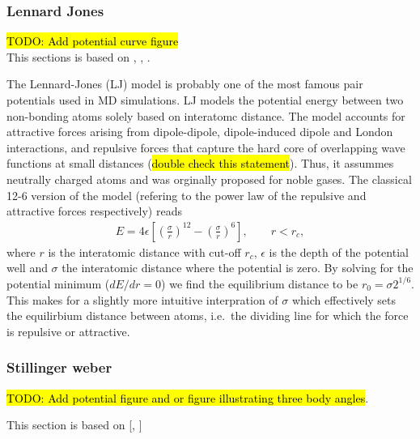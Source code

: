 \subsubsection{Lennard Jones}
\hl{TODO: Add potential curve figure} \\
This sections is based on \cite{docs_lammps_LJ}, \cite{C9CP05445F}, \cite{chem_libretexts_LJ}.

The Lennard-Jones (LJ) model is probably one of the most famous pair potentials
used in MD simulations. LJ models the potential energy between two non-bonding
atoms solely based on interatomc distance. The model accounts for attractive
forces arising from dipole-dipole, dipole-induced dipole and London
interactions, and repulsive forces that capture the hard core of overlapping wave functions at small distances (\hl{double check this statement}). Thus, it assummes
neutrally charged atoms and was orginally proposed for noble gases. The
classical 12-6 version of the model (refering to the power law of the repulsive
and attractive forces respectively) reads
\begin{align}
  E = 4\epsilon \left[\left(\frac{\sigma}{r}\right)^{12} - \left(\frac{\sigma}{r}\right)^6 \right ], \qquad r < r_c,
  \label{eq:LJ}
\end{align}
where $r$ is the interatomic distance with cut-off $r_c$, $\epsilon$ is the
depth of the potential well and $\sigma$ the interatomic distance where the potential is
zero. By solving for the potential minimum ($dE/dr = 0$) we find the equilibrium
distance to be $r_0 = \sigma 2^{1/6}$. This makes for a slightly more intuitive
interpration of $\sigma$ which effectively sets the equilirbium distance between
atoms, i.e.\ the dividing line for which the force is repulsive or
attractive. 




\subsubsection{Stillinger weber}
\hl{TODO: Add potential figure and or figure illustrating three body angles}.

This section is based on [\cite{docs_lammps_sw}, \cite{PhysRevB.31.5262}]


